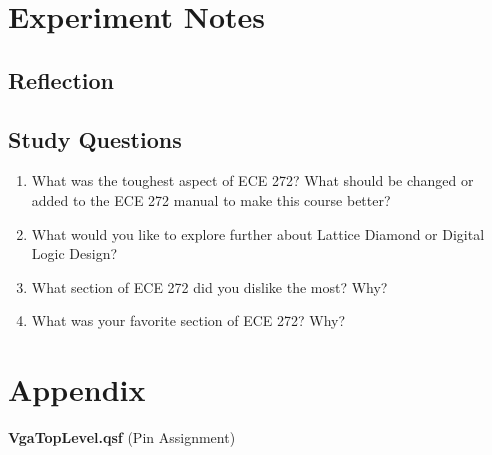 \documentclass[12pt]{article}
\numberwithin{figure}{section}
\begin{document}
\section{Experiment Notes}

\subsection*{Reflection}

\subsection*{Study Questions}

\begin{enumerate}
  \item What was the toughest aspect of ECE 272? What should be changed or added to the ECE 272 manual to make this course better?



  \item What would you like to explore further about Lattice Diamond or Digital Logic Design?



  \item What section of ECE 272 did you dislike the most? Why?



  \item What was your favorite section of ECE 272? Why?


\end{enumerate}

\section*{Appendix} \label{sec:appendix}

\begin{center}
  \textbf{VgaTopLevel.qsf} (Pin Assignment)
\end{center}

\inputminted[breaklines, firstline=38, fontfamily=tt, fontsize=\small, frame=lines, framesep=1.5em, linenos, numbersep=1.5em, style=vs]{text}{lab6/VgaTopLevel.qsf}
\end{document}
